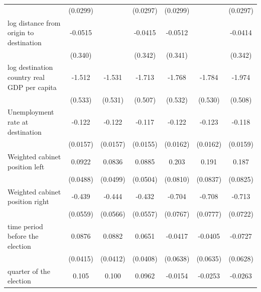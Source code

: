 \documentclass[a4paper,12pt]{article}
\newcommand{\sym}[1]{\rlap{#1}}
\begin{document}
\begin{table}
\begin{tabular}{l*{6}{c}}
	&  (0.0299)         &                   &  (0.0297)         &  (0.0299)         &                   &  (0.0297)         \\
	[0.3em]
	log distance from origin to destination &   -0.0515         &                   &   -0.0415         &   -0.0512         &                   &   -0.0414         \\
	&   (0.340)         &                   &   (0.342)         &   (0.341)         &                   &   (0.342)         \\
	[0.3em]
	log destination country real GDP per capita&    -1.512\sym{**} &    -1.531\sym{**} &    -1.713\sym{**} &    -1.768\sym{**} &    -1.784\sym{**} &    -1.974\sym{***}\\
	&   (0.533)         &   (0.531)         &   (0.507)         &   (0.532)         &   (0.530)         &   (0.508)         \\
	[0.3em]
	Unemployment rate at destination        &    -0.122\sym{***}&    -0.122\sym{***}&    -0.117\sym{***}&    -0.122\sym{***}&    -0.123\sym{***}&    -0.118\sym{***}\\
	&  (0.0157)         &  (0.0157)         &  (0.0155)         &  (0.0162)         &  (0.0162)         &  (0.0159)         \\
	[0.3em]
	Weighted cabinet position left          &    0.0922         &    0.0836         &    0.0885         &     0.203\sym{*}  &     0.191\sym{*}  &     0.187\sym{*}  \\
	&  (0.0488)         &  (0.0499)         &  (0.0504)         &  (0.0810)         &  (0.0837)         &  (0.0825)         \\
	[0.3em]
	Weighted cabinet position right         &    -0.439\sym{***}&    -0.444\sym{***}&    -0.432\sym{***}&    -0.704\sym{***}&    -0.708\sym{***}&    -0.713\sym{***}\\
	&  (0.0559)         &  (0.0566)         &  (0.0557)         &  (0.0767)         &  (0.0777)         &  (0.0722)         \\
	[0.3em]
	time period before the election         &    0.0876\sym{*}  &    0.0882\sym{*}  &    0.0651         &   -0.0417         &   -0.0405         &   -0.0727         \\
	&  (0.0415)         &  (0.0412)         &  (0.0408)         &  (0.0638)         &  (0.0635)         &  (0.0628)         \\
	[0.3em]
	quarter of the election                 &     0.105\sym{*}  &     0.100\sym{*}  &    0.0962         &   -0.0154         &   -0.0253         &   -0.0263         \\

\end{tabular}
\end{table}
\end{document}
